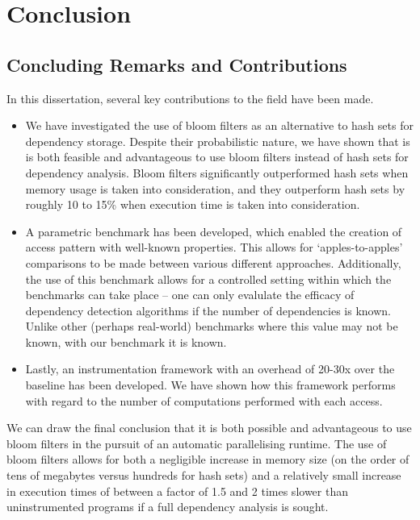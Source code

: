\chapter{Conclusion} \label{chp:conclusion}
\section{Concluding Remarks and Contributions} \label{sec:conclusion/remarks}
In this dissertation, several key contributions to the field have been made.

\begin{itemize}
	\item We have investigated the use of bloom filters as an alternative to hash sets for dependency storage. Despite their probabilistic nature, we have shown that is is both feasible and advantageous to use bloom filters instead of hash sets for dependency analysis. Bloom filters significantly outperformed hash sets when memory usage is taken into consideration, and they outperform hash sets by roughly 10 to 15\% when execution time is taken into consideration.
	
	\item A parametric benchmark has been developed, which enabled the creation of access pattern with well-known properties. This allows for `apples-to-apples' comparisons to be made between various different approaches. Additionally, the use of this benchmark allows for a controlled setting within which the benchmarks can take place -- one can only evalulate the efficacy of dependency detection algorithms if the number of dependencies is known. Unlike other (perhaps real-world) benchmarks where this value may not be known, with our benchmark it is known.
	
	\item Lastly, an instrumentation framework with an overhead of 20-30x over the baseline has been developed. We have shown how this framework performs with regard to the number of computations performed with each access.
\end{itemize}

We can draw the final conclusion that it is both possible and advantageous to use bloom filters in the pursuit of an automatic parallelising runtime. The use of bloom filters allows for both a negligible increase in memory size (on the order of tens of megabytes versus hundreds for hash sets) and a relatively small increase in execution times of between a factor of 1.5 and 2 times slower than uninstrumented programs if a full dependency analysis is sought.

